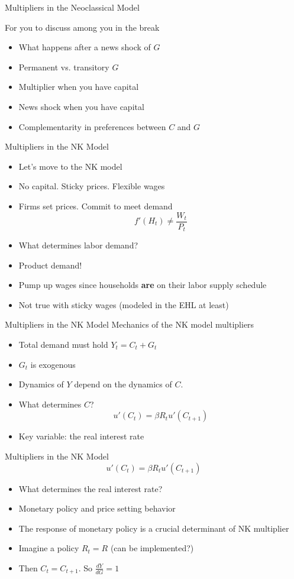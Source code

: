 \documentclass[english,xcolor=svgnames]{beamer}
\begin{document}
\begin{frame}{Multipliers in the Neoclassical Model}
\begin{center}For you to discuss among you in the break\end{center}
\begin{itemize}
\item What happens after a news shock of $G$
\item Permanent vs. transitory $G$
\item Multiplier when you have capital
\item News shock when you have capital
\item Complementarity in preferences between $C$ and $G$
\end{itemize}
\end{frame}

\begin{frame}{Multipliers in the NK Model}
\begin{itemize}
\item Let's move to the NK model
\item No capital. Sticky prices. Flexible wages
\item Firms set prices. Commit to meet demand
$$f'(H_t) \neq \frac{W_t}{P_t}$$
\item What determines labor demand?
\item Product demand!
\item Pump up wages since households \textbf{are} on their labor supply schedule
\item Not true with sticky wages (modeled in the EHL at least)
\end{itemize}
\end{frame}

\begin{frame}{Multipliers in the NK Model}
Mechanics of the NK model multipliers
\begin{itemize}
\item Total demand must hold $Y_t = C_t + G_t$
\item $G_t$ is exogenous
\item Dynamics of $Y$ depend on the dynamics of $C$.
\item What determines $C$?
$$u'(C_t) = \beta R_t u'(C_{t+1})$$
\item Key variable: the real interest rate
\end{itemize}
\end{frame}


\begin{frame}{Multipliers in the NK Model}
$$u'(C_t) = \beta R_t u'(C_{t+1})$$
\begin{itemize}
\item What determines the real interest rate?
\item Monetary policy and price setting behavior
\item The response of monetary policy is a crucial determinant of NK multiplier	
\item Imagine a policy $R_t = R$ (can be implemented?)
\item Then $C_t = C_{t+1}$. So $\frac{dY}{dG} = 1$
\end{itemize}
\end{frame}
\end{document}
